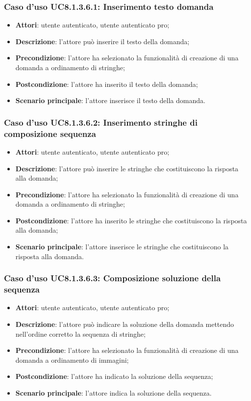 \subsubsection{Caso d'uso UC8.1.3.6.1: Inserimento testo domanda}
	\begin{itemize}
		\item \textbf{Attori}: utente autenticato, utente autenticato pro;
		\item \textbf{Descrizione}: l'attore può inserire il testo della domanda;
		\item\textbf{Precondizione}: l'attore ha selezionato la funzionalità di creazione di una domanda a ordinamento di stringhe;
		\item \textbf{Postcondizione}: l'attore ha inserito il testo della domanda;
		\item\textbf{Scenario principale}: l'attore inserisce il testo della domanda.
	\end{itemize}
	
\subsubsection{Caso d'uso UC8.1.3.6.2: Inserimento stringhe di composizione sequenza}
	\begin{itemize}
		\item \textbf{Attori}: utente autenticato, utente autenticato pro;
		\item \textbf{Descrizione}: l'attore può inserire le stringhe che costituiscono la risposta alla domanda;
		\item\textbf{Precondizione}: l'attore ha selezionato la funzionalità di creazione di una domanda a ordinamento di stringhe;
		\item \textbf{Postcondizione}: l'attore ha inserito le stringhe che costituiscono la risposta alla domanda;
		\item\textbf{Scenario principale}: l'attore inserisce le stringhe che costituiscono la risposta alla domanda.
	\end{itemize}
	
\subsubsection{Caso d'uso UC8.1.3.6.3: Composizione soluzione della sequenza}
	\begin{itemize}
		\item \textbf{Attori}: utente autenticato, utente autenticato pro;
		\item \textbf{Descrizione}: l'attore può indicare la soluzione della domanda mettendo nell'ordine corretto la sequenza di stringhe;
		\item\textbf{Precondizione}: l'attore ha selezionato la funzionalità di creazione di una domanda a ordinamento di immagini;
		\item \textbf{Postcondizione}: l'attore ha indicato la soluzione della sequenza;
		\item\textbf{Scenario principale}: l'attore indica la soluzione della sequenza. 
	\end{itemize}
